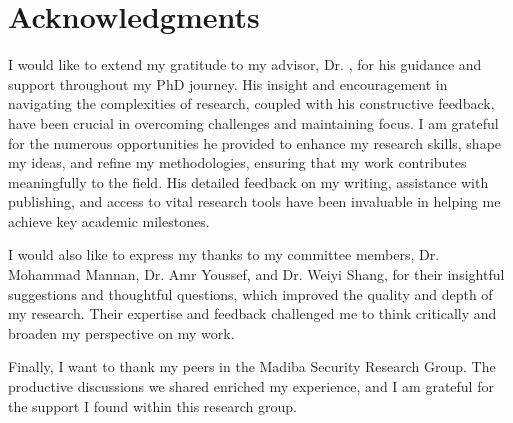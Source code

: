 
\chapter*{Acknowledgments}
I would like to extend my gratitude to my advisor, Dr. \supv, for his guidance and support throughout my PhD journey. His insight and encouragement in navigating the complexities of research, coupled with his constructive feedback, have been crucial in overcoming challenges and maintaining focus. I am grateful for the numerous opportunities he provided to enhance my research skills, shape my ideas, and refine my methodologies, ensuring that my work contributes meaningfully to the field. His detailed feedback on my writing, assistance with publishing, and access to vital research tools have been invaluable in helping me achieve key academic milestones.

I would also like to express my thanks to my committee members, Dr. Mohammad Mannan, Dr. Amr Youssef, and Dr. Weiyi Shang, for their insightful suggestions and thoughtful questions, which improved the quality and depth of my research. Their expertise and feedback challenged me to think critically and broaden my perspective on my work.

Finally, I want to thank my peers in the Madiba Security Research Group. The productive discussions we shared enriched my experience, and I am grateful for the support I found within this research group.